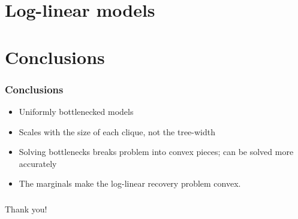 \documentclass[xcolor={svgnames}]{beamer}
\begin{document}
\section{Log-linear models}

\section{Conclusions}

\begin{frame}
  \frametitle{Conclusions}
  \begin{itemize}
      \item Uniformly bottlenecked models
      \item Scales with the size of each clique, not the tree-width
      \item Solving bottlenecks breaks problem into convex pieces; can be solved more accurately
      \item The marginals make the log-linear recovery problem convex.
  \end{itemize}
\end{frame}

\begin{frame}
  \frametitle{}
    Thank you!
\end{frame}
\end{document}
